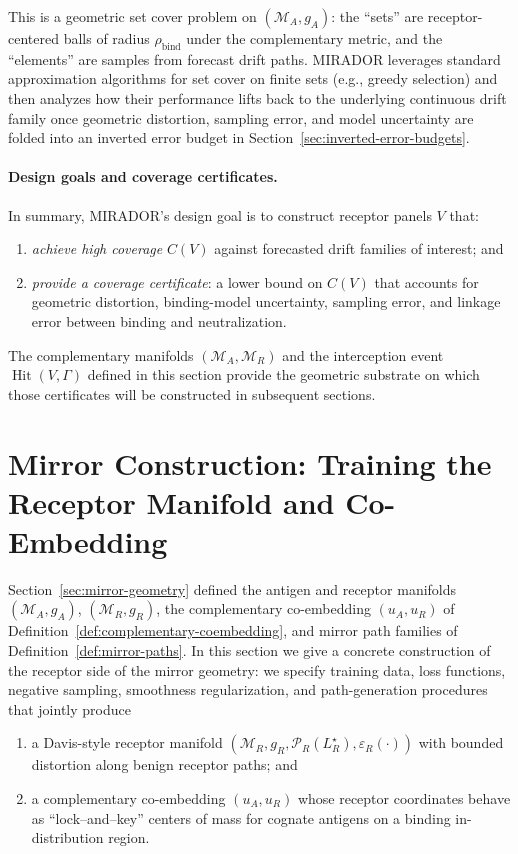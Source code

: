 \documentclass[11pt]{article}
\newcommand{\M}{\mathcal{M}}
\newcommand{\Pcal}{\mathcal{P}}
\newcommand{\Hit}{\operatorname{Hit}}
\begin{document}
This is a geometric set cover problem on $(\M_A,g_A)$: the ``sets'' are receptor-centered balls of radius $\rho_{\mathrm{bind}}$ under the complementary metric, and the ``elements'' are samples from forecast drift paths. MIRADOR leverages standard approximation algorithms for set cover on finite sets (e.g., greedy selection) and then analyzes how their performance lifts back to the underlying continuous drift family once geometric distortion, sampling error, and model uncertainty are folded into an inverted error budget in Section~\ref{sec:inverted-error-budgets}.

\paragraph{Design goals and coverage certificates.}
In summary, MIRADOR's design goal is to construct receptor panels $V$ that:
\begin{enumerate}
  \item \emph{achieve high coverage} $C(V)$ against forecasted drift families of interest; and
  \item \emph{provide a coverage certificate}: a lower bound on $C(V)$ that accounts for geometric distortion, binding-model uncertainty, sampling error, and linkage error between binding and neutralization.
\end{enumerate}
The complementary manifolds $(\M_A,\M_R)$ and the interception event $\Hit(V,\Gamma)$ defined in this section provide the geometric substrate on which those certificates will be constructed in subsequent sections.


\section{Mirror Construction: Training the Receptor Manifold and Co-Embedding}
\label{sec:mirror-construction}

Section~\ref{sec:mirror-geometry} defined the antigen and receptor manifolds
$(\M_A,g_A)$, $(\M_R,g_R)$, the complementary co-embedding
$(u_A,u_R)$ of Definition~\ref{def:complementary-coembedding}, and mirror
path families of Definition~\ref{def:mirror-paths}. In this section we give a
concrete construction of the receptor side of the mirror geometry:
we specify training data, loss functions, negative sampling, smoothness
regularization, and path-generation procedures that jointly produce

\begin{enumerate}
  \item a Davis-style receptor manifold $(\M_R,g_R,\Pcal_R(L_R^\star),\varepsilon_R(\cdot))$ with bounded distortion along benign receptor paths; and
  \item a complementary co-embedding $(u_A,u_R)$ whose receptor coordinates
  behave as “lock–and–key” centers of mass for cognate antigens on a binding
  in-distribution region.
\end{enumerate}
\end{document}

